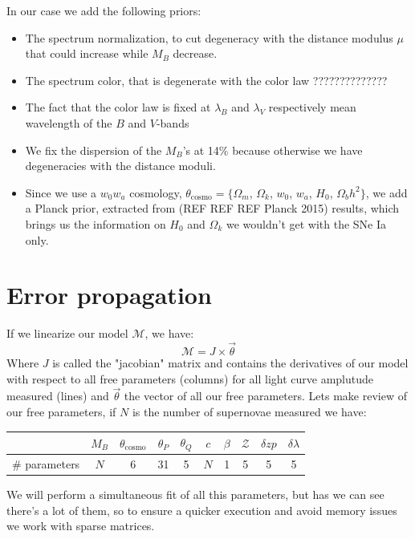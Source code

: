 \documentclass[\docopts]{\docclass}
\begin{document}
In our case we add the following priors:
\begin{itemize}
\item The spectrum normalization, to cut degeneracy with the distance modulus $\mu$ that could increase while $M_B$ decrease.
\item The spectrum color, that is degenerate with the color law ??????????????
\item The fact that the color law is fixed at $\lambda_B$ and $\lambda_V$ respectively mean wavelength of the $B$ and $V$-bands
\item We fix the dispersion of the $M_B$'s at 14\% because otherwise we have degeneracies with the distance moduli.
\item Since we use a $w_0w_a$ cosmology, $\theta_\text{cosmo} = \{ \Omega_m$, $\Omega_k$, $w_0$, $w_a$, $H_0$, $\Omega_bh^2 \}$, we add a Planck prior, extracted from (REF REF REF Planck 2015) results, which brings us the information on $H_0$ and $\Omega_k$ we wouldn't get with the SNe Ia only.
\end{itemize}



\section{Error propagation}
\label{sec::linalg}

If we linearize our model $\mathcal{M}$, we have:
\begin{equation}
\mathcal{M} = J \times \vec\theta
\end{equation}
Where $J$ is called the "jacobian" matrix and contains the derivatives of our model with respect to all free parameters (columns) for all light curve amplutude measured (lines) and $\vec\theta$ the vector of all our free parameters.
Lets make review of our free parameters, if $N$ is the number of supernovae measured we have:

\begin{tabular}{l|ccccccccc}
  \hline
  \hline
    & $M_B$ & $\theta_\text{cosmo}$ & $\theta_P$ & $\theta_Q$ & $c$ & $\beta$ & $\mathcal{Z}$ & $\delta zp$ & $\delta \lambda$ \\
  \hline
  \# parameters & $N$ & 6 & 31 & 5 & $N$ & 1 & 5 & 5 & 5 \\
  \hline
\end{tabular}

We will perform a simultaneous fit of all this parameters, but has we can see there's a lot of them, so to ensure a quicker execution and avoid memory issues we work with sparse matrices.
\end{document}
